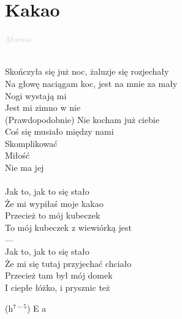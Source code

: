 \documentclass[a5paper, 10pt]{book}
\begin{document}
\section{Kakao}\textcolor{lightgray}{\textit{Mumio}}\\~\\
\begin{minipage}[t]{0.8\textwidth}
  Skończyła się już noc, żaluzje się rozjechały\\
  Na głowę naciągam koc, jest na mnie za mały\\
  Nogi wystają mi\\
  Jest mi zimno w nie\\
  (Prawdopodobnie) Nie kocham już ciebie\\

  Coś się musiało między nami\\
  Skomplikować\\
  Miłość\\
  Nie ma jej\\
  \\
  \hspace*{5mm}Jak to, jak to się stało\\
  \hspace*{5mm}Że mi wypiłaś moje kakao\\
  \hspace*{5mm}Przecież to mój kubeczek\\
  \hspace*{5mm}To mój kubeczek z wiewiórką jest\\

  ---\\

  \hspace*{5mm}Jak to, jak to się stało\\
  \hspace*{5mm}Że mi się tutaj przyjechać chciało\\
  \hspace*{5mm}Przecież tam był mój domek\\
  \hspace*{5mm}I ciepłe łóżko, i prysznic też\\
\end{minipage}
\begin{minipage}[t]{0.2\textwidth}
  (h$^{7-5}$) E a\\
  \\
  \\
  \\
\end{minipage}
\end{document}
